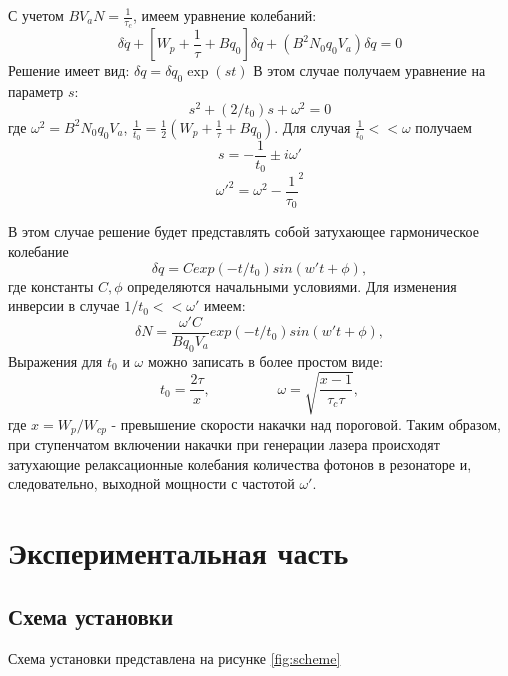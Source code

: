 \documentclass[a4paper]{article}
\begin{document}
С учетом $B V_a N = \frac{1}{\tau_c}$, имеем уравнение колебаний:
\begin{equation*}
\delta\ddot{q} + [W_p + \frac{1}{\tau} + Bq_0]\delta\dot{q} + (B^2N_0q_0V_a)\delta q = 0
\end{equation*}
Решение имеет вид: $\delta q = \delta q_0 \exp(st)$
В этом случае получаем уравнение на параметр $s$:
\begin{equation*}
s^2 + (2/t_0)s + \omega^2 = 0
\end{equation*}
где $\omega^2 = B^2N_0q_0V_a$, $\frac{1}{t_0} = \frac{1}{2}(W_p +\frac{1}{\tau} + Bq_0 )$. Для случая $\frac{1}{t_0} << \omega$ получаем
\begin{equation*}
s = - \frac{1}{t_0}\pm i\omega'
\end{equation*}
\begin{equation*}
\omega'^2 = \omega^2 - \frac{1}{\tau_0}^2
\end{equation*}

В этом случае решение будет представлять собой затухающее гармоническое колебание 
\begin{equation*}
\delta q = C exp(-t/t_0)sin(w't + \phi),
\end{equation*}
где константы $C, \phi$ определяются начальными условиями. Для изменения инверсии в случае $1/t_0 << \omega'$ имеем:
\begin{equation*}
\delta N = \frac{\omega' C}{Bq_0V_a} exp(-t/t_0)sin(w't + \phi),
\end{equation*}
Выражения для $t_0$ и $\omega$ можно записать в более простом виде:
\begin{equation*}
t_0 = \frac{2\tau}{x}, \hspace{2cm} \omega = \sqrt{\frac{x-1}{\tau_c \tau}}, 
\end{equation*}
где $x = W_p / W_{cp}$ - превышение скорости накачки над пороговой. Таким образом, при ступенчатом включении накачки при генерации лазера происходят затухающие релаксационные колебания количества фотонов в резонаторе и, следовательно, выходной мощности с частотой $\omega'$.




\newpage

\section{Экспериментальная часть}
\subsection{Схема установки}
Схема установки представлена на рисунке \ref{fig:scheme}
\end{document}
